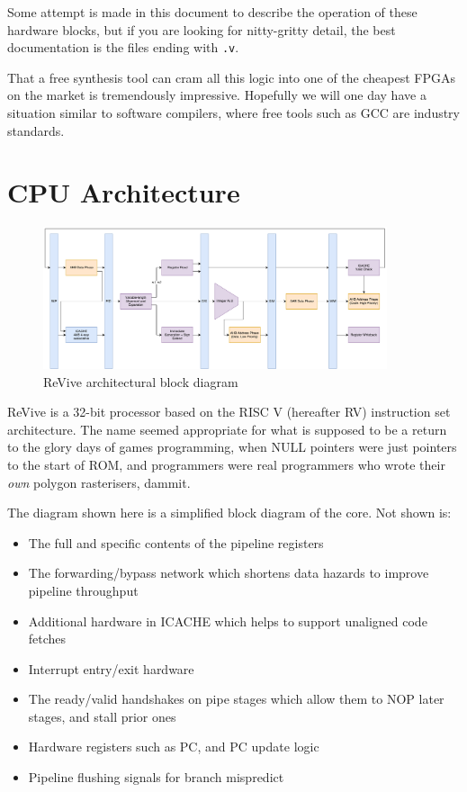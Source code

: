\documentclass{article}
\begin{document}
Some attempt is made in this document to describe the operation of these hardware blocks, but if you are looking for nitty-gritty detail, the best documentation is the files ending with \texttt{.v}.

That a free synthesis tool can cram all this logic into one of the cheapest FPGAs on the market is tremendously impressive. Hopefully we will one day have a situation similar to software compilers, where free tools such as GCC are industry standards.

\section{CPU Architecture}

\begin{figure}[!htb]
\caption{ReVive architectural block diagram}
\centering
\includegraphics[width=0.9\textwidth]{diagrams/cpu_block.pdf}
\end{figure}

ReVive is a 32-bit processor based on the RISC V (hereafter RV) instruction set architecture. The name seemed appropriate for what is supposed to be a return to the glory days of games programming, when NULL pointers were just pointers to the start of ROM, and programmers were real programmers who wrote their \textit{own} polygon rasterisers, dammit.

The diagram shown here is a simplified block diagram of the core. Not shown is:
\begin{itemize}
\item The full and specific contents of the pipeline registers
\item The forwarding/bypass network which shortens data hazards to improve pipeline throughput
\item Additional hardware in ICACHE which helps to support unaligned code fetches
\item Interrupt entry/exit hardware
\item The ready/valid handshakes on pipe stages which allow them to NOP later stages, and stall prior ones
\item Hardware registers such as PC, and PC update logic
\item Pipeline flushing signals for branch mispredict
\end{itemize}
\end{document}
